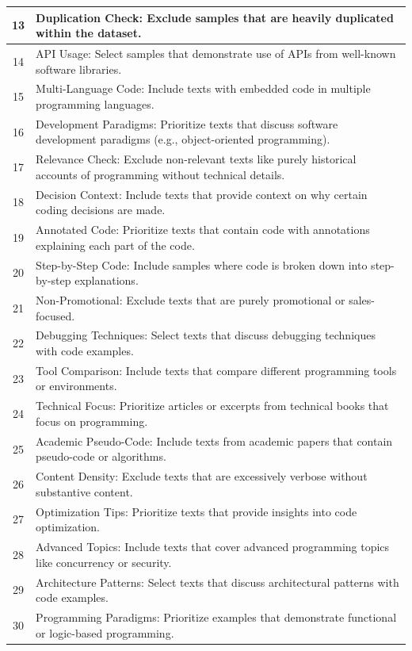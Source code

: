 \documentclass{article}
\begin{document}
\begin{longtable}{c|p{14cm}}
13 & Duplication Check: Exclude samples that are heavily duplicated within the dataset. \\
\hline
14 & API Usage: Select samples that demonstrate use of APIs from well-known software libraries. \\
\hline
15 & Multi-Language Code: Include texts with embedded code in multiple programming languages. \\
\hline
16 & Development Paradigms: Prioritize texts that discuss software development paradigms (e.g., object-oriented programming). \\
\hline
17 & Relevance Check: Exclude non-relevant texts like purely historical accounts of programming without technical details. \\
\hline
18 & Decision Context: Include texts that provide context on why certain coding decisions are made. \\
\hline
19 & Annotated Code: Prioritize texts that contain code with annotations explaining each part of the code. \\
\hline
20 & Step-by-Step Code: Include samples where code is broken down into step-by-step explanations. \\
\hline
21 & Non-Promotional: Exclude texts that are purely promotional or sales-focused. \\
\hline
22 & Debugging Techniques: Select texts that discuss debugging techniques with code examples. \\
\hline
23 & Tool Comparison: Include texts that compare different programming tools or environments. \\
\hline
24 & Technical Focus: Prioritize articles or excerpts from technical books that focus on programming. \\
\hline
25 & Academic Pseudo-Code: Include texts from academic papers that contain pseudo-code or algorithms. \\
\hline
26 & Content Density: Exclude texts that are excessively verbose without substantive content. \\
\hline
27 & Optimization Tips: Prioritize texts that provide insights into code optimization. \\
\hline
28 & Advanced Topics: Include texts that cover advanced programming topics like concurrency or security. \\
\hline
29 & Architecture Patterns: Select texts that discuss architectural patterns with code examples. \\
\hline
30 & Programming Paradigms: Prioritize examples that demonstrate functional or logic-based programming. \\

\end{longtable}
\end{document}
